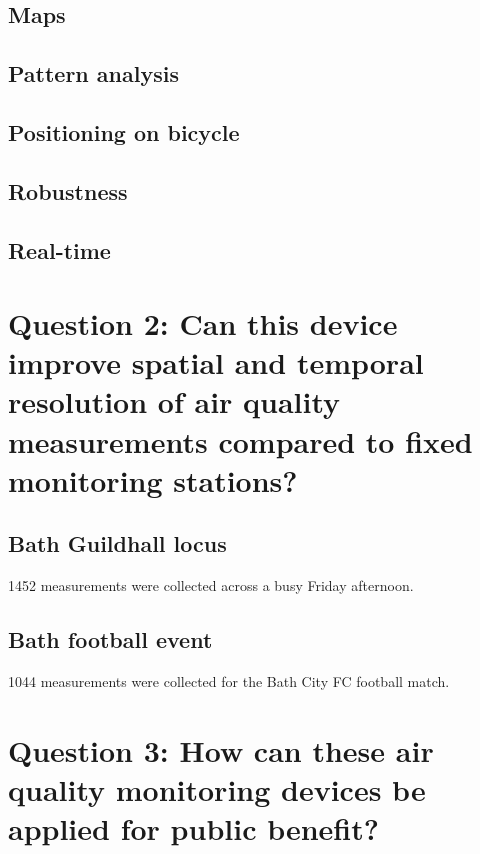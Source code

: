\documentclass[11pt]{report}
\begin{document}
\subsection{Maps}

\subsection{Pattern analysis}

\subsection{Positioning on bicycle}

\subsection{Robustness}

\subsection{Real-time}


\section{Question 2: Can this device improve spatial and temporal resolution of air quality measurements compared to fixed monitoring stations?} \label{q2_results}

\subsection{Bath Guildhall locus}

\num{1452} measurements were collected across a busy Friday afternoon.

\subsection{Bath football event}

\num{1044} measurements were collected for the Bath City FC football match.


\section{Question 3: How can these air quality monitoring devices be applied for public benefit?} \label{q3_results}
\end{document}
